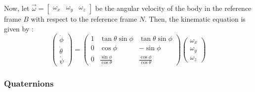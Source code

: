  Now, let $\vec{\omega}=[\begin{array}{ccc}\omega_x & \omega_y & \omega_z\end{array}]$ be the angular velocity of the body in the reference frame $B$ with respect to the reference frame $N$. Then, the kinematic equation is given by \cite{Fossen:1994}:
 \begin{equation}\label{vitesse}
   \left(\begin{array}{c}
           \dot{\phi} \\
           \dot{\theta} \\
           \dot{\psi}\end{array}\right)=\left(\begin{array}{ccc}
                                                1 & \tan\theta\sin\phi & \tan\theta\sin\phi \\
                                                0 & \cos\phi & -\sin\phi \\
                                                0 & \frac{\sin\phi}{\cos\theta} & \frac{\cos\phi}{\cos\theta}
                                              \end{array}\right)\left(\begin{array}{c}
                                                                        \omega_x \\
                                                                        \omega_y \\
                                                                        \omega_z
                                                                      \end{array}
                                              \right)
 \end{equation}

 \subsubsection{Quaternions}


